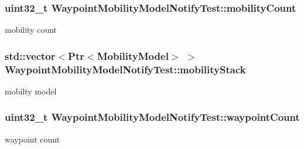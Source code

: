 \subsubsection[{\texorpdfstring{mobility\+Count}{mobilityCount}}]{\setlength{\rightskip}{0pt plus 5cm}uint32\+\_\+t Waypoint\+Mobility\+Model\+Notify\+Test\+::mobility\+Count\hspace{0.3cm}{\ttfamily [private]}}\hypertarget{classWaypointMobilityModelNotifyTest_aadb1d796ea62f4f7255539bec44cb6ef}{}\label{classWaypointMobilityModelNotifyTest_aadb1d796ea62f4f7255539bec44cb6ef}


mobility count 

\subsubsection[{\texorpdfstring{mobility\+Stack}{mobilityStack}}]{\setlength{\rightskip}{0pt plus 5cm}std\+::vector$<${\bf Ptr}$<${\bf Mobility\+Model}$>$ $>$ Waypoint\+Mobility\+Model\+Notify\+Test\+::mobility\+Stack\hspace{0.3cm}{\ttfamily [private]}}\hypertarget{classWaypointMobilityModelNotifyTest_a7e6de57e6fbec72887e4cc25c7e561d3}{}\label{classWaypointMobilityModelNotifyTest_a7e6de57e6fbec72887e4cc25c7e561d3}


mobilty model 

\subsubsection[{\texorpdfstring{waypoint\+Count}{waypointCount}}]{\setlength{\rightskip}{0pt plus 5cm}uint32\+\_\+t Waypoint\+Mobility\+Model\+Notify\+Test\+::waypoint\+Count\hspace{0.3cm}{\ttfamily [private]}}\hypertarget{classWaypointMobilityModelNotifyTest_a54c74c8def841c5a4376550ec36b73c5}{}\label{classWaypointMobilityModelNotifyTest_a54c74c8def841c5a4376550ec36b73c5}


waypoint count 

